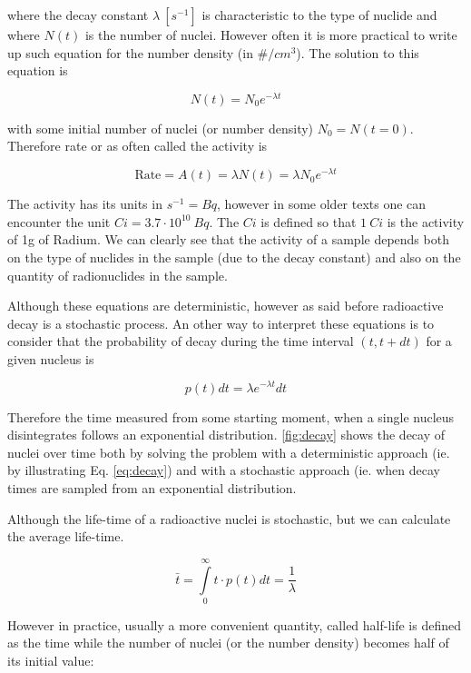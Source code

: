 \noindent where the decay constant $\lambda \: [s^{-1}]$ is characteristic to the type of nuclide and where $N(t)$ is the number of nuclei. However often it is more practical to write up such equation for the number density (in $\#/cm^3$). The solution to this equation is

\begin{equation}\label{eq:decay}
N(t)=N_0e^{-\lambda t}
\end{equation}

\noindent with some initial number of nuclei (or number density) $N_0=N(t=0)$. Therefore rate or as often called the activity is

\begin{equation}
\text{Rate}=A(t)=\lambda N(t)=\lambda N_0e^{-\lambda t}
\end{equation}

The activity has its units in $s^{-1}=Bq$, however in some older texts one can encounter the unit $Ci=3.7 \cdot 10^{10}\: Bq$. The $Ci$ is defined so that $1 \: Ci$ is the activity of 1g of Radium. We can clearly see that the activity of a sample depends both on the type of nuclides in the sample (due to the decay constant) and also on the quantity of radionuclides in the sample.

Although these equations are deterministic, however as said before radioactive decay is a stochastic process. An other way to interpret these equations is to consider that the probability of decay during the time interval $(t,t+dt)$ for a given nucleus is

\begin{equation}
p(t)dt=\lambda e^{-\lambda t}dt
\end{equation}

Therefore the time measured from some starting moment, when a single nucleus disintegrates follows an exponential distribution. \autoref{fig:decay} shows the decay of nuclei over time both by solving the problem with a deterministic approach (ie. by illustrating Eq. \eqref{eq:decay}) and with a stochastic approach (ie. when decay times are sampled from an exponential distribution. 

Although the life-time of a radioactive nuclei is stochastic, but we can calculate the average life-time.

\begin{equation}
\bar{t}=\int\limits_0^\infty{t\cdot p(t) dt}=\frac{1}{\lambda}
\end{equation}

However in practice, usually a more convenient quantity, called half-life is defined as the time while the number of nuclei (or the number density) becomes half of its initial value:


